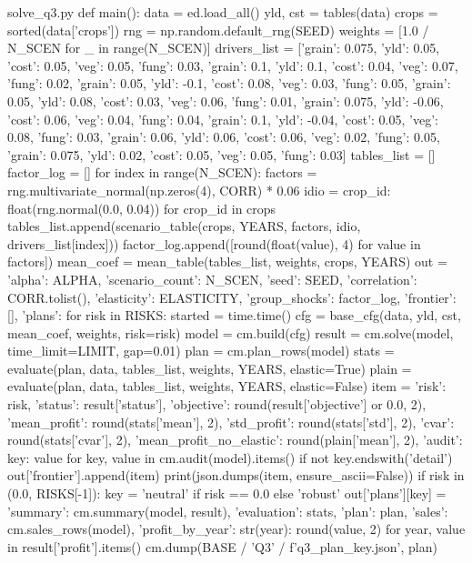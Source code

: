 \documentclass[bwprint]{gmcmthesis}
\begin{document}
\begin{appendices}
\begin{Python}{solve\_q3.py}
def main():
    data = ed.load_all()
    yld, cst = tables(data)
    crops = sorted(data['crops'])
    rng = np.random.default_rng(SEED)
    weights = [1.0 / N_SCEN for _ in range(N_SCEN)]
    drivers_list = [{'grain': 0.075, 'yld': 0.05, 'cost': 0.05, 'veg': 0.05, 'fung': 0.03}, {'grain': 0.1, 'yld': 0.1, 'cost': 0.04, 'veg': 0.07, 'fung': 0.02}, {'grain': 0.05, 'yld': -0.1, 'cost': 0.08, 'veg': 0.03, 'fung': 0.05}, {'grain': 0.05, 'yld': 0.08, 'cost': 0.03, 'veg': 0.06, 'fung': 0.01}, {'grain': 0.075, 'yld': -0.06, 'cost': 0.06, 'veg': 0.04, 'fung': 0.04}, {'grain': 0.1, 'yld': -0.04, 'cost': 0.05, 'veg': 0.08, 'fung': 0.03}, {'grain': 0.06, 'yld': 0.06, 'cost': 0.06, 'veg': 0.02, 'fung': 0.05}, {'grain': 0.075, 'yld': 0.02, 'cost': 0.05, 'veg': 0.05, 'fung': 0.03}]
    tables_list = []
    factor_log = []
    for index in range(N_SCEN):
        factors = rng.multivariate_normal(np.zeros(4), CORR) * 0.06
        idio = {crop_id: float(rng.normal(0.0, 0.04)) for crop_id in crops}
        tables_list.append(scenario_table(crops, YEARS, factors, idio, drivers_list[index]))
        factor_log.append([round(float(value), 4) for value in factors])
    mean_coef = mean_table(tables_list, weights, crops, YEARS)
    out = {'alpha': ALPHA, 'scenario_count': N_SCEN, 'seed': SEED, 'correlation': CORR.tolist(), 'elasticity': ELASTICITY, 'group_shocks': factor_log, 'frontier': [], 'plans': {}}
    for risk in RISKS:
        started = time.time()
        cfg = base_cfg(data, yld, cst, mean_coef, weights, risk=risk)
        model = cm.build(cfg)
        result = cm.solve(model, time_limit=LIMIT, gap=0.01)
        plan = cm.plan_rows(model)
        stats = evaluate(plan, data, tables_list, weights, YEARS, elastic=True)
        plain = evaluate(plan, data, tables_list, weights, YEARS, elastic=False)
        item = {'risk': risk, 'status': result['status'], 'objective': round(result['objective'] or 0.0, 2), 'mean_profit': round(stats['mean'], 2), 'std_profit': round(stats['std'], 2), 'cvar': round(stats['cvar'], 2), 'mean_profit_no_elastic': round(plain['mean'], 2), 'audit': {key: value for key, value in cm.audit(model).items() if not key.endswith('detail')}}
        out['frontier'].append(item)
        print(json.dumps(item, ensure_ascii=False))
        if risk in (0.0, RISKS[-1]):
            key = 'neutral' if risk == 0.0 else 'robust'
            out['plans'][key] = {'summary': cm.summary(model, result), 'evaluation': stats, 'plan': plan, 'sales': cm.sales_rows(model), 'profit_by_year': {str(year): round(value, 2) for year, value in result['profit'].items()}}
            cm.dump(BASE / 'Q3' / f'q3_plan_{key}.json', plan)

\end{Python}
\end{appendices}
\end{document}
